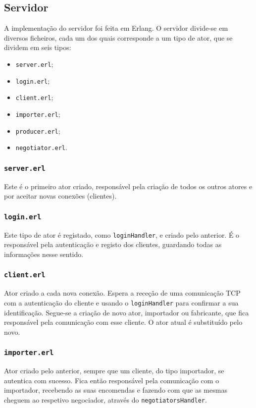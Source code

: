 \documentclass[a4paper]{report}
\begin{document}
	\subsection{Servidor}
	A implementação do servidor foi feita em Erlang. O servidor divide-se em diversos ficheiros, cada um dos quais corresponde a um tipo de ator, que se dividem em seis tipos:
	\begin{itemize}
		\item \texttt{server.erl};
		\item \texttt{login.erl};
		\item \texttt{client.erl};
		\item \texttt{importer.erl};
		\item \texttt{producer.erl};
		\item \texttt{negotiator.erl}.
	\end{itemize}

	\subsubsection{\texttt{server.erl}}
	Este é o primeiro ator criado, responsável pela criação de todos os outros atores e por aceitar novas conexões (clientes).

	\subsubsection{\texttt{login.erl}}
	Este tipo de ator é registado, como \texttt{loginHandler}, e criado pelo anterior. É o responsável pela autenticação e registo dos clientes, guardando todas as informações nesse sentido.

	\subsubsection{\texttt{client.erl}}
	Ator criado a cada nova conexão. Espera a receção de uma comunicação TCP com a autenticação do cliente e usando o \texttt{loginHandler} para confirmar a sua identificação.
	Segue-se a criação de novo ator, importador ou fabricante, que fica responsável pela comunicação com esse cliente. O ator atual é substituído pelo novo.

	\subsubsection{\texttt{importer.erl}}
	Ator criado pelo anterior, sempre que um cliente, do tipo importador, se autentica com sucesso. 
	Fica então responsável pela comunicação com o importador, recebendo as suas encomendas e fazendo com que as mesmas cheguem ao respetivo negociador, através do \texttt{negotiatorsHandler}.
\end{document}
